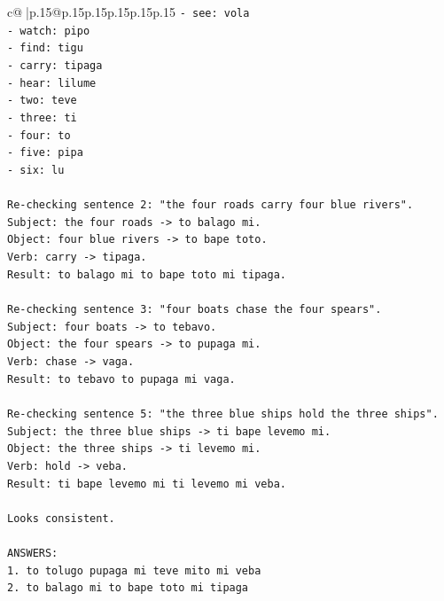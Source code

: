\documentclass{article}
\begin{document}
{\begin{supertabular}{c@{$\;$}|p{.15\linewidth}@{}p{.15\linewidth}p{.15\linewidth}p{.15\linewidth}p{.15\linewidth}p{.15\linewidth}}
{{{\texttt{{-} see: vola} \\
\texttt{{-} watch: pipo} \\
\texttt{{-} find: tigu} \\
\texttt{{-} carry: tipaga} \\
\texttt{{-} hear: lilume} \\
\texttt{{-} two: teve} \\
\texttt{{-} three: ti} \\
\texttt{{-} four: to} \\
\texttt{{-} five: pipa} \\
\texttt{{-} six: lu} \\
\\ 
\texttt{Re{-}checking sentence 2: "the four roads carry four blue rivers".} \\
\texttt{Subject: the four roads {-}> to balago mi.} \\
\texttt{Object: four blue rivers {-}> to bape toto.} \\
\texttt{Verb: carry {-}> tipaga.} \\
\texttt{Result: to balago mi to bape toto mi tipaga.} \\
\\ 
\texttt{Re{-}checking sentence 3: "four boats chase the four spears".} \\
\texttt{Subject: four boats {-}> to tebavo.} \\
\texttt{Object: the four spears {-}> to pupaga mi.} \\
\texttt{Verb: chase {-}> vaga.} \\
\texttt{Result: to tebavo to pupaga mi vaga.} \\
\\ 
\texttt{Re{-}checking sentence 5: "the three blue ships hold the three ships".} \\
\texttt{Subject: the three blue ships {-}> ti bape levemo mi.} \\
\texttt{Object: the three ships {-}> ti levemo mi.} \\
\texttt{Verb: hold {-}> veba.} \\
\texttt{Result: ti bape levemo mi ti levemo mi veba.} \\
\\ 
\texttt{Looks consistent.} \\
\\ 
\texttt{ANSWERS:} \\
\texttt{1. to tolugo pupaga mi teve mito mi veba} \\
\texttt{2. to balago mi to bape toto mi tipaga} \\
}}}
\end{supertabular}}
\end{document}
